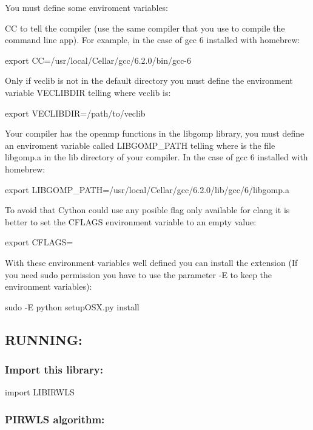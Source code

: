 You must define some enviroment variables\+:

CC to tell the compiler (use the same compiler that you use to compile the command line app). For example, in the case of gcc 6 installed with homebrew\+: \begin{DoxyVerb}export CC=/usr/local/Cellar/gcc/6.2.0/bin/gcc-6
\end{DoxyVerb}


Only if veclib is not in the default directory you must define the environment variable V\+E\+C\+L\+I\+B\+D\+IR telling where veclib is\+: \begin{DoxyVerb}export VECLIBDIR=/path/to/veclib
\end{DoxyVerb}


Your compiler has the openmp functions in the libgomp library, you must define an enviroment variable called L\+I\+B\+G\+O\+M\+P\+\_\+\+P\+A\+TH telling where is the file libgomp.\+a in the lib directory of your compiler. In the case of gcc 6 installed with homebrew\+: \begin{DoxyVerb}export LIBGOMP_PATH=/usr/local/Cellar/gcc/6.2.0/lib/gcc/6/libgomp.a
\end{DoxyVerb}


To avoid that Cython could use any posible flag only available for clang it is better to set the C\+F\+L\+A\+GS environment variable to an empty value\+: \begin{DoxyVerb}export CFLAGS=
\end{DoxyVerb}


With these environment variables well defined you can install the extension (If you need sudo permission you have to use the parameter -\/E to keep the environment variables)\+: \begin{DoxyVerb}sudo -E python setupOSX.py install
\end{DoxyVerb}


\subsection*{R\+U\+N\+N\+I\+NG\+:}

\subsubsection*{Import this library\+:}

\begin{DoxyVerb}    import LIBIRWLS
\end{DoxyVerb}


\subsubsection*{P\+I\+R\+W\+LS algorithm\+:}

